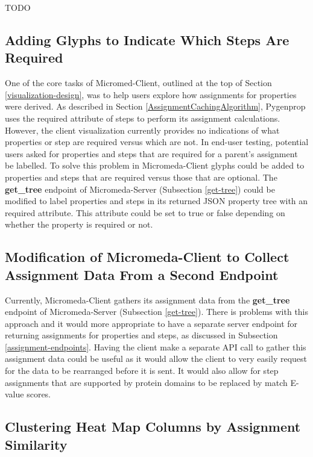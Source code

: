 TODO

\subsection{Adding Glyphs to Indicate Which Steps Are Required}

One of the core tasks of Micromed-Client, outlined at the top of Section \ref{visualization-design}, was to help users explore how assignments for properties were derived. As described in Section \ref{AssignmentCachingAlgorithm}, Pygenprop uses the required attribute of steps to perform its assignment calculations. However, the client visualization currently provides no indications of what properties or step are required versus which are not. In end-user testing, potential users asked for properties and steps that are required for a parent's assignment be labelled. To solve this problem in Micromeda-Client glyphs could be added to properties and steps that are required versus those that are optional. The \textbf{get\_tree} endpoint of Micromeda-Server (Subsection \ref{get-tree}) could be modified to label properties and steps in its returned JSON property tree with an required attribute. This attribute could be set to true or false depending on whether the property is required or not. 

\subsection{Modification of Micromeda-Client to Collect Assignment Data From a Second Endpoint}

Currently, Micromeda-Client gathers its assignment data from the \textbf{get\_tree} endpoint of Micromeda-Server (Subsection \ref{get-tree}). There is problems with this approach and it would more appropriate to have a separate server endpoint for returning assignments for properties and steps, as discussed in Subsection \ref{assignment-endpoints}. Having the client make a separate API call to gather this assignment data could be useful as it would allow the client to very easily request for the data to be rearranged before it is sent. It would also allow for step assignments that are supported by protein domains to be replaced by match E-value scores.

\subsection{Clustering Heat Map Columns by Assignment Similarity}

